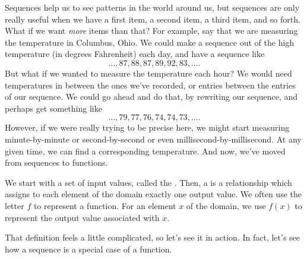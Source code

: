 \documentclass{ximera}
\begin{document}
Sequences help us to see patterns in the world around us, but sequences are only really useful when we have a first item, a second item, a third item, and so forth. What if we want \emph{more} items than that? For example, say that we are measuring the temperature in Columbus, Ohio. We could make a sequence out of the high temperature (in degrees Fahrenheit) each day, and have a sequence like
\[
\dots, 87, 88, 87, 89, 92, 83, \dots.
\]
But what if we wanted to measure the temperature each hour? We would need temperatures in between the ones we've recorded, or entries between the entries of our sequence. We could go ahead and do that, by rewriting our sequence, and perhaps get something like
\[
\dots, 79, 77, 76, 74, 74, 73, \dots.
\]
However, if we were really trying to be precise here, we might start measuring minute-by-minute or second-by-second or even millisecond-by-millisecond. At any given time, we can find a corresponding temperature. And now, we've moved from sequences to functions.
\begin{definition}
We start with a set of input values, called the . Then, a  is a relationship which assigns to each element of the domain exactly one output value. We often use the letter $f$ to represent a function. For an element $x$ of the domain, we use $f(x)$ to represent the output value associated with $x$.
\end{definition}
That definition feels a little complicated, so let's see it in action. In fact, let's see how a sequence is a special case of a function.
\end{document}
